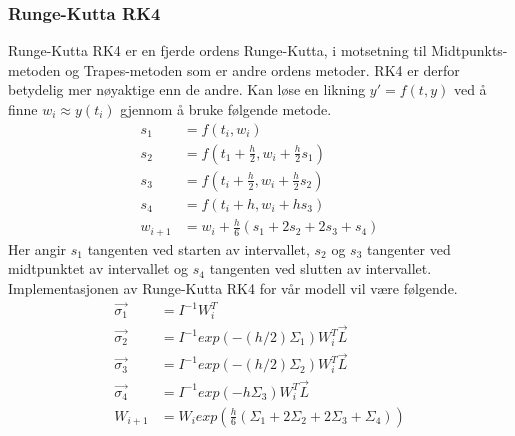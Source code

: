 \subsubsection{Runge-Kutta RK4}
Runge-Kutta RK4 er en fjerde ordens Runge-Kutta, i motsetning til Midtpunkts-metoden og Trapes-metoden som er andre ordens metoder. RK4 er derfor betydelig mer nøyaktige enn de andre. \newline\newline
Kan løse en likning $y' = f(t, y)$ ved å finne $w_i \approx y(t_i)$ gjennom å bruke følgende metode. 
\begin{equation}
\begin{aligned}
    s_1&=f(t_i, w_i)\\
    s_2&=f(t_1+\frac{h}{2}, w_i + \frac{h}{2}s_1)\\
    s_3&=f(t_i+\frac{h}{2}, w_i+\frac{h}{2}s_2)\\
    s_4&=f(t_i+h, w_i+hs_3)\\
    w_{i+1}&=w_i+\frac{h}{6}(s_1+2s_2+2s_3+s_4)
\end{aligned}
\end{equation}
Her angir $s_1$ tangenten ved starten av intervallet, $s_2$ og $s_3$ tangenter ved midtpunktet av intervallet og $s_4$ tangenten ved slutten av intervallet.\newline\newline
Implementasjonen av Runge-Kutta RK4 for vår modell vil være følgende.
\begin{equation}
\begin{aligned}
    \Vec{\sigma_1}&=I^{-1}W^T_i\\
    \Vec{\sigma_2}&=I^{-1}exp(-(h/2)\Sigma_1)W^T_i\Vec{L}\\
    \Vec{\sigma_3}&=I^{-1}exp(-(h/2)\Sigma_2)W^T_i\Vec{L}\\
    \Vec{\sigma_4}&=I^{-1}exp(-h\Sigma_3)W^T_i\Vec{L}\\
    W_{i+1}&=W_iexp(\frac{h}{6}(\Sigma_1+2\Sigma_2+2\Sigma_3+\Sigma_4))
\end{aligned}
\end{equation}

